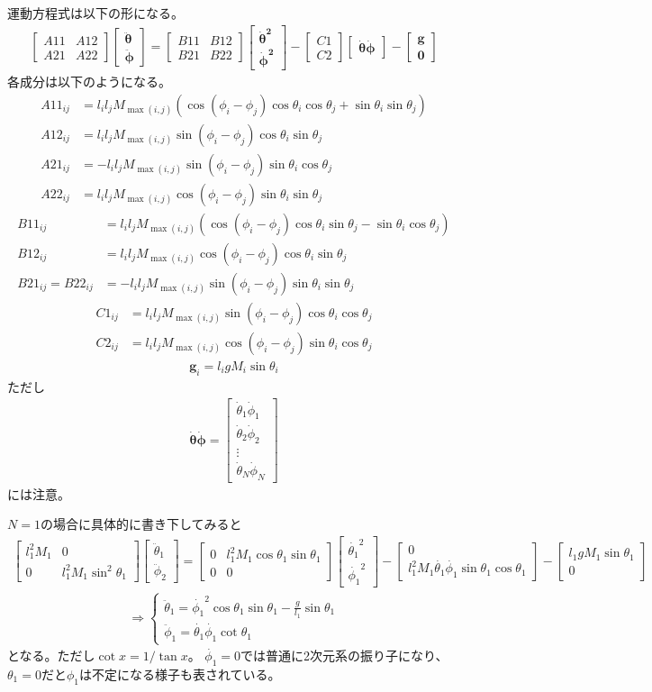 \documentclass{jsarticle}
\newcommand{\eqa}[1]{\begin{align}#1\end{align}}
\newcommand{\so}{\Rightarrow}
\newcommand{\bmat}[1]{\begin{bmatrix}#1\end{bmatrix}}
\newcommand{\paren}[1]{\left(#1\right)}
\newcommand{\ccost}[2]{\cos\theta_{#1} \cos\theta_{#2}}
\newcommand{\ssint}[2]{\sin\theta_{#1} \sin\theta_{#2}}
\newcommand{\cosp}[2]{\cos\left(\phi_{#1}-\phi_{#2}\right)}
\newcommand{\sinp}[2]{\sin\left(\phi_{#1}-\phi_{#2}\right)}
\newcommand{\dott}[1]{\dot{\theta}_{#1}}
\newcommand{\dotp}[1]{\dot{\phi}_{#1}}
\newcommand{\ddott}[1]{\ddot{\theta}_{#1}}
\newcommand{\ddotp}[1]{\ddot{\phi}_{#1}}
\begin{document}
運動方程式は以下の形になる。
\eqa{
	\bmat{A11 & A12  \\ A21 & A22} \bmat{\bm{\ddot{\theta}} \\ \bm{\ddot{\phi}}} 
		= \bmat{B11 & B12 \\ B21 & B22} \bmat{\bm{\dot{\theta}^2} \\ \bm{\dot{\phi}^2}}
			- \bmat{C1 \\ C2} \bmat{\bm{\dot{\theta} \dot{\phi}}} - \bmat{\bm{g} \\ \bm{0}}
}
各成分は以下のようになる。
\eqa{
	A11_{ij} &= l_i l_j M_{\max\paren{i, j}} \paren{ \cosp{i}{j} \ccost{i}{j} + \ssint{i}{j}} \\
	A12_{ij} &= l_i l_j M_{\max\paren{i, j}} \sinp{i}{j} \cos{\theta_i} \sin{\theta_j} \\
	A21_{ij} &= -l_i l_j M_{\max\paren{i, j}} \sinp{i}{j} \sin{\theta_i} \cos{\theta_j} \\
	A22_{ij} &= l_i l_j M_{\max\paren{i, j}} \cosp{i}{j} \ssint{i}{j}
}
\eqa{
	B11_{ij} &= l_i l_j M_{\max\paren{i, j}} \paren{ \cosp{i}{j} \cos{\theta_i} \sin{\theta_j} - \sin{\theta_i} \cos{\theta_j}} \\
	B12_{ij} &= l_i l_j M_{\max\paren{i, j}} \cosp{i}{j} \cos{\theta_i} \sin{\theta_j} \\
	B21_{ij} = B22_{ij} &= -l_i l_j M_{\max\paren{i, j}} \sinp{i}{j} \ssint{i}{j}
}
\eqa{
	C1_{ij} &= l_i l_j M_{\max\paren{i, j}} \sinp{i}{j} \ccost{i}{j} \\
	C2_{ij} &= l_i l_j M_{\max\paren{i, j}} \cosp{i}{j} \sin{\theta_i} \cos{\theta_j}
}
\eqa{
	\bm{g}_i = l_i g M_i \sin{\theta_i}
}
ただし
\eqa{
	\bm{\dot{\theta} \dot{\phi}} = \bmat{\dott{1} \dotp{1} \\ \dott{2} \dotp{2} \\ \vdots \\ \dott{N} \dotp{N}}
}
には注意。

$N=1$の場合に具体的に書き下してみると
\eqa{
	\bmat{l_1^2 M_1 & 0 \\ 0 & l_1^2 M_1 \sin^2\theta_1} \bmat{\ddott{1} \\ \ddotp{2}} =
	\bmat{0 & l_1^2 M_1 \cos\theta_1 \sin\theta_1 \\  0 & 0} \bmat{\dot{\theta_1}^2 \\ \dot{\phi_1}^2}
	- \bmat{0 \\ l_1^2 M_1 \dot{\theta_1} \dot{\phi_1} \sin\theta_1\cos\theta_1}
	- \bmat{l_1 g M_1 \sin\theta_1 \\ 0}
}
\eqa{
	\so
	\begin{cases}
		\ddott{1} = \dot{\phi_1}^2 \cos\theta_1 \sin\theta_1- \frac{g}{l_1} \sin\theta_1 \\
		\ddotp{1} = \dot{\theta_1} \dot{\phi_1} \cot{\theta_1}
	\end{cases}
}
となる。ただし$\cot x = 1 / \tan x$。
$\dot{\phi_1}=0$では普通に2次元系の振り子になり、$\theta_1=0$だと$\phi_1$は不定になる様子も表されている。
\end{document}

